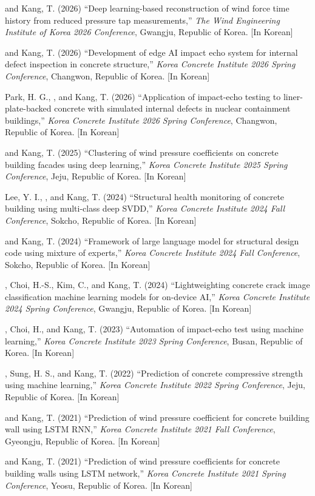 \begin{pubSubsectionNum}
    \item \me and Kang, T. (2026) ``Deep learning-based reconstruction of wind force time history from reduced pressure tap measurements,'' \textit{The Wind Engineering Institute of Korea 2026 Conference}, Gwangju, Republic of Korea. [In Korean]
    \item \me and Kang, T. (2026) ``Development of edge AI impact echo system for internal defect inspection in concrete structure,'' \textit{Korea Concrete Institute 2026 Spring Conference}, Changwon, Republic of Korea. [In Korean]
    \item Park, H. G., \me, and Kang, T. (2026) ``Application of impact-echo testing to liner-plate-backed concrete with simulated internal defects in nuclear containment buildings,'' \textit{Korea Concrete Institute 2026 Spring Conference}, Changwon, Republic of Korea. [In Korean]
    \item \me and Kang, T. (2025) ``Clustering of wind pressure coefficients on concrete building facades using deep learning,'' \textit{Korea Concrete Institute 2025 Spring Conference}, Jeju, Republic of Korea. [In Korean]
    \item Lee, Y. I., \me, and Kang, T. (2024) ``Structural health monitoring of concrete building using multi-class deep SVDD,'' \textit{Korea Concrete Institute 2024 Fall Conference}, Sokcho, Republic of Korea. [In Korean]
    \item \me and Kang, T. (2024) ``Framework of large language model for structural design code using mixture of experts,'' \textit{Korea Concrete Institute 2024 Fall Conference}, Sokcho, Republic of Korea. [In Korean]
    \item \me, Choi, H.-S., Kim, C., and Kang, T. (2024) ``Lightweighting concrete crack image classification machine learning models for on-device AI,'' \textit{Korea Concrete Institute 2024 Spring Conference}, Gwangju, Republic of Korea. [In Korean]
    \item \me, Choi, H., and Kang, T. (2023) ``Automation of impact-echo test using machine learning,'' \textit{Korea Concrete Institute 2023 Spring Conference}, Busan, Republic of Korea. [In Korean]
    \item \me, Sung, H. S., and Kang, T. (2022) ``Prediction of concrete compressive strength using machine learning,'' \textit{Korea Concrete Institute 2022 Spring Conference}, Jeju, Republic of Korea. [In Korean]
    \item \me and Kang, T. (2021) ``Prediction of wind pressure coefficient for concrete building wall using LSTM RNN,'' \textit{Korea Concrete Institute 2021 Fall Conference}, Gyeongju, Republic of Korea. [In Korean]
    \item \me and Kang, T. (2021) ``Prediction of wind pressure coefficients for concrete building walls using LSTM network,'' \textit{Korea Concrete Institute 2021 Spring Conference}, Yeosu, Republic of Korea. [In Korean]
\end{pubSubsectionNum}
